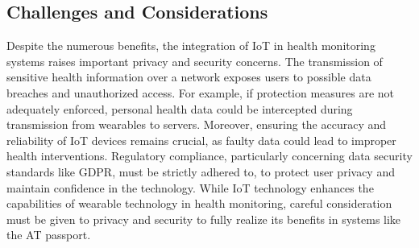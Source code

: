 \subsection{Challenges and Considerations}
Despite the numerous benefits, the integration of IoT in health monitoring
systems raises important privacy and security concerns. The transmission of
sensitive health information over a network exposes users to possible data
breaches and unauthorized access. For example, if protection measures are not
adequately enforced, personal health data could be intercepted during
transmission from wearables to servers. Moreover, ensuring the accuracy and
reliability of IoT devices remains crucial, as faulty data could lead to
improper health interventions. Regulatory compliance, particularly concerning
data security standards like GDPR, must be strictly adhered to, to protect user
privacy and maintain confidence in the technology. While IoT technology enhances
the capabilities of wearable technology in health monitoring, careful
consideration must be given to privacy and security to fully realize its
benefits in systems like the AT passport.